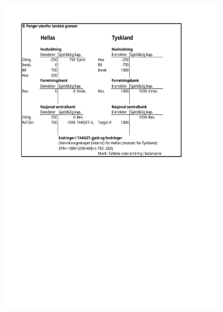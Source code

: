 \documentclass[notes=show notes]{beamer}
\begin{document}
\begin{frame}
\begin{figure}
\centering
\includegraphics[width=0.9\linewidth]{Fork1_delII}
\caption{}
\label{fig:Fork1_delII}
\end{figure}
\end{frame}
\end{document}
